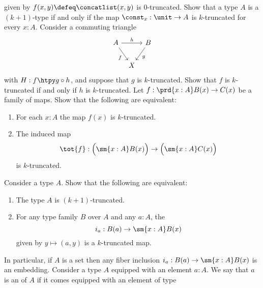 \begin{exercises}
  given by $f(x,y)\defeq\concatlist(x,y)$ is $0$-truncated.
  \exitem \label{ex:is-trunc-const}Show that a type $A$ is a $(k+1)$-type if and only if the map $\const_x:\unit\to A$ is $k$-truncated for every $x:A$.
  \exitem \label{ex:is-trunc-comp}Consider a commuting triangle
  \begin{equation*}
    \begin{tikzcd}[column sep=tiny]
      A \arrow[rr,"h"] \arrow[dr,swap,"f"] & & B \arrow[dl,"g"] \\
      & X
    \end{tikzcd}
  \end{equation*}
  with $H: f \htpy g \circ h$, and suppose that $g$ is $k$-truncated. Show that $f$ is $k$-truncated if and only if $h$ is $k$-truncated.
  \exitem Let $f:\prd{x:A}B(x)\to C(x)$ be a family of maps. Show that the following are equivalent:
  \begin{enumerate}
  \item For each $x:A$ the map $f(x)$ is $k$-truncated.
  \item The induced map
    \begin{equation*}
      \tot{f}:\Big(\sm{x:A}B(x)\Big)\to\Big(\sm{x:A}C(x)\Big)
    \end{equation*}
    is $k$-truncated.
  \end{enumerate}
  \exitem \label{ex:is-trunc-fiber-inclusion}Consider a type $A$. Show that the following are equivalent:
  \begin{enumerate}
  \item The type $A$ is $(k+1)$-truncated.
  \item For any type family $B$ over $A$ and any $a:A$, the 
    \begin{equation*}
      i_a: B(a)\to\sm{x:A}B(x)
    \end{equation*}
    given by $y\mapsto(a,y)$ is a $k$-truncated map.
  \end{enumerate}
  In particular, if $A$ is a set then any fiber inclusion $i_a:B(a)\to\sm{x:A}B(x)$ is an embedding.
  \exitem \label{ex:isolated-point}Consider a type $A$ equipped with an element $a:A$. We say that $a$ is an  of $A$ if it comes equipped with an element of type

\end{exercises}

